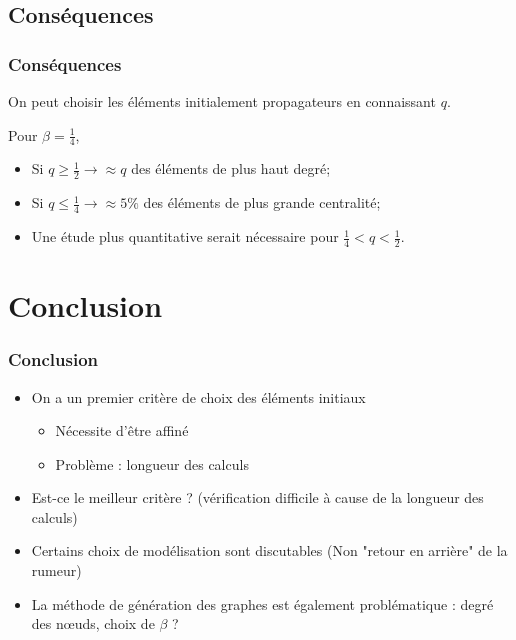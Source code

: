\documentclass{beamer}
\newcommand{\resultat}[1]{
  \fontsize{8}{10}\selectfont
  \begin{center}
  
  \end{center}
}
\begin{document}

\subsection{Conséquences}
\begin{frame}
  \frametitle{Conséquences}

  \begin{alertblock}{}
  \begin{center}
    On peut choisir les éléments initialement propagateurs en connaissant $q$.
  \end{center}
  \end{alertblock}
  Pour $\beta=\frac{1}{4}$,
  \begin{itemize}
    \item<2-> Si $q \geq \frac{1}{2} \rightarrow \approx q$ des éléments de plus haut degré;
    \item<3-> Si $q \leq \frac{1}{4} \rightarrow \approx 5\%$ des éléments de plus grande centralité;
    \item<4-> Une étude plus quantitative serait nécessaire pour $\frac{1}{4} < q < \frac{1}{2}$.
  \end{itemize}
\end{frame}
\section{Conclusion}
\begin{frame}
  \frametitle{Conclusion}
  \begin{itemize}
    \item<1->On a un premier critère de choix des éléments initiaux 
    \begin{itemize}
      \item<2->Nécessite d'être affiné
      \item<3->Problème : longueur des calculs
    \end{itemize}
    \item<4->Est-ce le meilleur critère ? (vérification difficile à cause de la longueur des calculs)
    \item<5->Certains choix de modélisation sont discutables (Non "retour en arrière" de la rumeur)
    \item<6->La méthode de génération des graphes est également problématique : degré des nœuds, choix de $\beta$ ?
  \end{itemize}
\end{frame}
\end{document}
